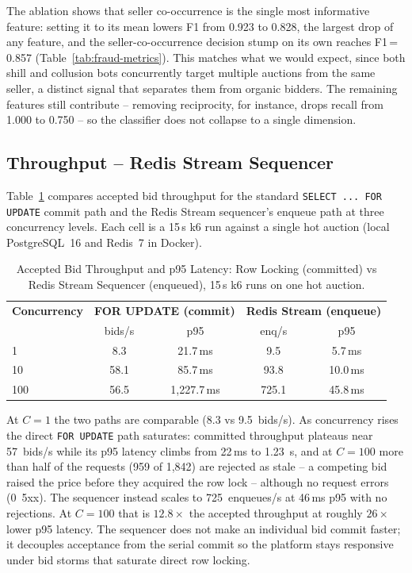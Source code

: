 \documentclass[conference]{IEEEtran}
\begin{document}
The ablation shows that seller co-occurrence is the single most
informative feature: setting it to its mean lowers F1 from 0.923 to
0.828, the largest drop of any feature, and the seller-co-occurrence
decision stump on its own reaches F1\,=\,0.857
(Table~\ref{tab:fraud-metrics}). This matches what we would expect, since
both shill and collusion bots concurrently target multiple auctions from
the same seller, a distinct signal that separates them from organic
bidders. The remaining features still contribute -- removing reciprocity,
for instance, drops recall from 1.000 to 0.750 -- so the classifier does
not collapse to a single dimension.

\subsection{Throughput -- Redis Stream Sequencer}
\label{sec:throughput}

Table~\ref{tab:throughput} compares accepted bid throughput for the
standard {\tt SELECT ... FOR UPDATE} commit path and the Redis Stream
sequencer's enqueue path at three concurrency levels. Each cell is a
15\,s k6 run against a single hot auction (local PostgreSQL~16 and
Redis~7 in Docker).

\begin{table}[h]
\centering
\begin{tabular}{lcccc}
\toprule
\textbf{Concurrency} & \multicolumn{2}{c}{\textbf{FOR UPDATE (commit)}} & \multicolumn{2}{c}{\textbf{Redis Stream (enqueue)}} \\
 & bids/s & p95 & enq/s & p95 \\
\midrule
1    & 8.3  & 21.7\,ms      & 9.5   & 5.7\,ms  \\
10   & 58.1 & 85.7\,ms      & 93.8  & 10.0\,ms \\
100  & 56.5 & 1{,}227.7\,ms & 725.1 & 45.8\,ms \\
\bottomrule
\end{tabular}
\vspace{8pt}
\caption{Accepted Bid Throughput and p95 Latency: Row Locking (committed)
vs Redis Stream Sequencer (enqueued), 15\,s k6 runs on one hot auction.}
\label{tab:throughput}
\end{table}

At $C\!=\!1$ the two paths are comparable (8.3 vs 9.5~bids/s). As
concurrency rises the direct {\tt FOR UPDATE} path saturates: committed
throughput plateaus near 57~bids/s while its p95 latency climbs from
22\,ms to 1.23~s, and at $C\!=\!100$ more than half of the requests
(959 of 1{,}842) are rejected as stale -- a competing bid raised the price
before they acquired the row lock -- although no request errors (0~5xx).
The sequencer instead scales to 725~enqueues/s at 46\,ms p95 with no
rejections. At $C\!=\!100$ that is $\mathbf{12.8\times}$ the accepted
throughput at roughly $26\times$ lower p95 latency. The sequencer does not
make an individual bid commit faster; it decouples acceptance from the
serial commit so the platform stays responsive under bid storms that
saturate direct row locking.
\end{document}
